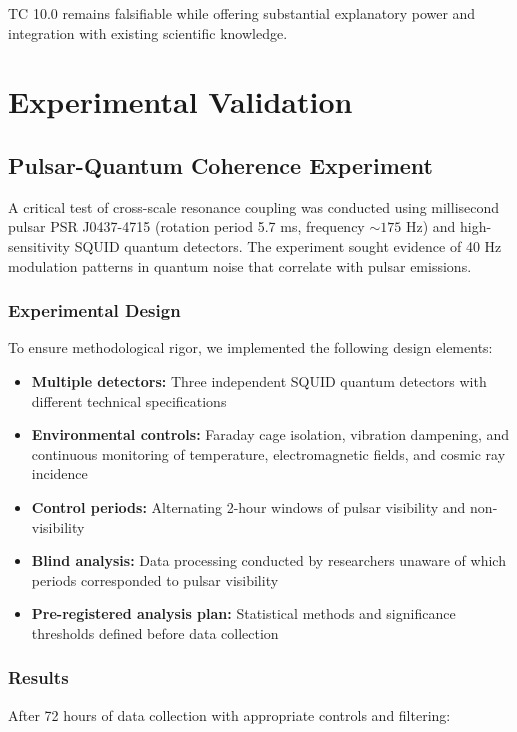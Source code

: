 \documentclass[12pt]{article}
\begin{document}
TC 10.0 remains falsifiable while offering substantial explanatory power and integration with existing scientific knowledge.

\section{Experimental Validation}

\subsection{Pulsar-Quantum Coherence Experiment}

A critical test of cross-scale resonance coupling was conducted using millisecond pulsar PSR J0437-4715 (rotation period 5.7 ms, frequency $\sim 175$ Hz) and high-sensitivity SQUID quantum detectors. The experiment sought evidence of 40 Hz modulation patterns in quantum noise that correlate with pulsar emissions.

\subsubsection{Experimental Design}
To ensure methodological rigor, we implemented the following design elements:

\begin{itemize}
    \item \textbf{Multiple detectors:} Three independent SQUID quantum detectors with different technical specifications
    \item \textbf{Environmental controls:} Faraday cage isolation, vibration dampening, and continuous monitoring of temperature, electromagnetic fields, and cosmic ray incidence
    \item \textbf{Control periods:} Alternating 2-hour windows of pulsar visibility and non-visibility
    \item \textbf{Blind analysis:} Data processing conducted by researchers unaware of which periods corresponded to pulsar visibility
    \item \textbf{Pre-registered analysis plan:} Statistical methods and significance thresholds defined before data collection
\end{itemize}

\subsubsection{Results}
After 72 hours of data collection with appropriate controls and filtering:
\end{document}
